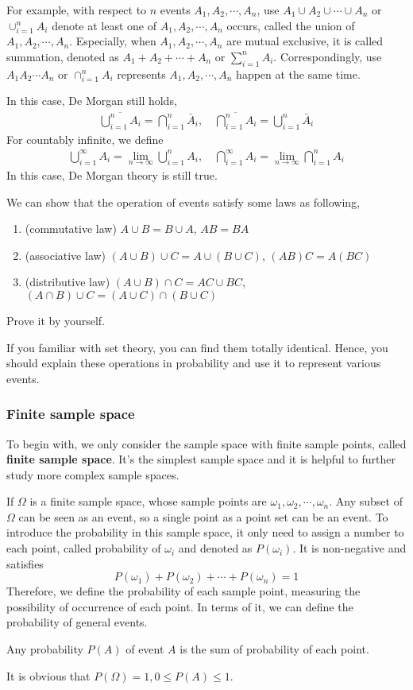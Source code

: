 For example, with respect to $n$ events $A_1,A_2,\cdots,A_n$, use $A_1\cup A_2 \cup \cdots \cup A_n$ or $\cup_{i=1}^n A_i$ denote at least one of $A_1,A_2,\cdots,A_n$ occurs, called the union of $A_1,A_2,\cdots,A_n$. Especially, when $A_1,A_2,\cdots,A_n$ are mutual exclusive, it is called summation, denoted as $A_1 + A_2 +\cdots +A_n$ or $\sum_{i=1}^n A_i$. Correspondingly, use $A_1 A_2\cdots A_n$ or $\cap_{i=1}^n A_i$ represents $A_1,A_2,\cdots,A_n$ happen at the same time.

In this case, De Morgan still holds,
\begin{align*}
    \overline{\bigcup_{i=1}^n A_i} = \bigcap_{i=1}^n \bar{A}_i, \quad \overline{\bigcap_{i=1}^n A_i} = \bigcup_{i=1}^n \bar{A}_i
\end{align*}
For countably infinite, we define
\begin{align*}
    \bigcup_{i=1}^\infty A_i = \lim_{n\to \infty} \bigcup_{i=1}^n A_i, \quad \bigcap_{i=1}^\infty A_i =\lim_{n\to \infty} \bigcap_{i=1}^n A_i
\end{align*}
In this case, De Morgan theory is still true.

We can show that the operation of events satisfy some laws as following,
\begin{enumerate}
    \item (commutative law) $A\cup B = B \cup A$, $AB=BA$
    \item (associative law) $(A\cup B) \cup C = A \cup (B \cup C)$, $(AB)C=A(BC)$
    \item (distributive law) $(A\cup B) \cap C = AC \cup BC$, $(A\cap B) \cup C = (A\cup C) \cap (B\cup C)$
\end{enumerate}
Prove it by yourself.

If you familiar with set theory, you can find them totally identical. Hence, you should explain these operations in probability and use it to represent various events.


\subsubsection{Finite sample space}

To begin with, we only consider the sample space with finite sample points, called \textbf{finite sample space}. It's the simplest sample space and it is helpful to further study more complex sample spaces.

If $\Omega$ is a finite sample space, whose sample points are $\omega_1,\omega_2,\cdots, \omega_n$. Any subset of $\Omega$ can be seen as an event, so a single point as a point set can be an event. To introduce the probability in this sample space, it only need to assign a number to each point, called probability of $\omega_i$ and denoted as $P(\omega_i)$. It is non-negative and satisfies
$$
P(\omega_1) +P(\omega_2)+\cdots + P(\omega_n) =1
$$
Therefore, we define the probability of each sample point, measuring the possibility of occurrence of each point. In terms of it, we can define the probability of general events.
\begin{defn}
    Any probability $P(A)$ of event $A$ is the sum of probability of each point.
\end{defn}
It is obvious that $P(\Omega)=1, 0\leq P(A) \leq 1$.

